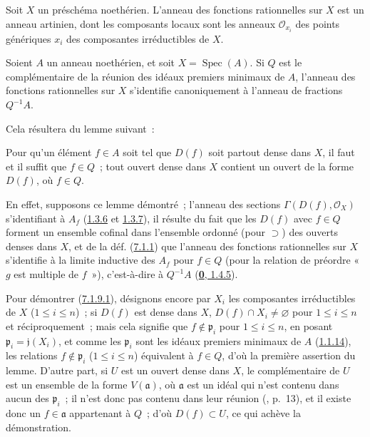 \begin{corollary}[7.1.8]
\label{I.7.1.8-fr}
Soit $X$ un préschéma noethérien. L'anneau des fonctions rationnelles sur $X$
est un anneau artinien, dont les composants locaux sont les anneaux
$\mathscr{O}_{x_i}$ des points génériques $x_i$ des composantes irréductibles
de $X$.
\end{corollary}

\begin{corollary}[7.1.9]
\label{I.7.1.9-fr}
Soient $A$ un anneau noethérien, et soit $X=\operatorname{Spec}(A)$. Si $Q$ est
le complémentaire de la réunion des idéaux premiers minimaux de $A$, l'anneau
des fonctions rationnelles sur $X$ s'identifie canoniquement à l'anneau de
fractions $Q^{-1}A$.
\end{corollary}

Cela résultera du lemme suivant~:

\begin{lemma}[7.1.9.1]
\label{I.7.1.9.1-fr}
Pour qu'un élément $f\in A$ soit tel que $D(f)$ soit partout dense dans $X$, il
faut et il suffit que $f\in Q$~; tout ouvert dense dans $X$ contient un ouvert
de la forme $D(f)$, où $f\in Q$.
\end{lemma}

En effet, supposons ce lemme démontré~; l'anneau des sections
$\Gamma(D(f),\mathscr{O}_X)$ s'identifiant à $A_f$
(\hyperref[I.1.3.6-fr]{1.3.6} et \hyperref[I.1.3.7-fr]{1.3.7}), il résulte du
fait que les $D(f)$ avec $f\in Q$ forment un ensemble cofinal dans l'ensemble
ordonné (pour $\supset$) des ouverts denses dans $X$, et de la déf.
(\hyperref[I.7.1.1-fr]{7.1.1}) que l'anneau des fonctions rationnelles sur $X$
s'identifie à la limite inductive des $A_f$ pour $f\in Q$ (pour la relation de
préordre «~$g$ est multiple de $f$~»), c'est-à-dire à $Q^{-1}A$
(\hyperref[0.1.4.5-fr]{\textbf{0}, 1.4.5}).

Pour démontrer (\hyperref[I.7.1.9.1-fr]{7.1.9.1}), désignons encore par $X_i$
les composantes irréductibles de $X$ ($1\leq i\leq n$)~; si $D(f)$ est dense
dans $X$, $D(f)\cap X_i\neq\varnothing$ pour $1\leq i\leq n$ et
réciproquement~; mais cela signifie que $f\notin\mathfrak{p}_i$ pour
$1\leq i\leq n$, en posant $\mathfrak{p}_i=\mathfrak{j}(X_i)$, et comme les
$\mathfrak{p}_i$ sont les idéaux premiers minimaux de $A$
(\hyperref[I.1.1.14-fr]{1.1.14}), les relations
$f\notin\mathfrak{p}_i$ ($1\leq i\leq n$) équivalent à $f\in Q$, d'où la
première assertion du lemme. D'autre part, si $U$ est un ouvert dense dans $X$,
le complémentaire de $U$ est un ensemble de la forme $V(\mathfrak{a})$, où
$\mathfrak{a}$ est un idéal qui n'est contenu dans aucun des $\mathfrak{p}_i$~;
il n'est donc pas contenu dans leur réunion (\cite{I-10}, p.~13), et il existe
donc un $f\in\mathfrak{a}$ appartenant à $Q$~; d'où $D(f)\subset U$, ce qui
achève la démonstration.

